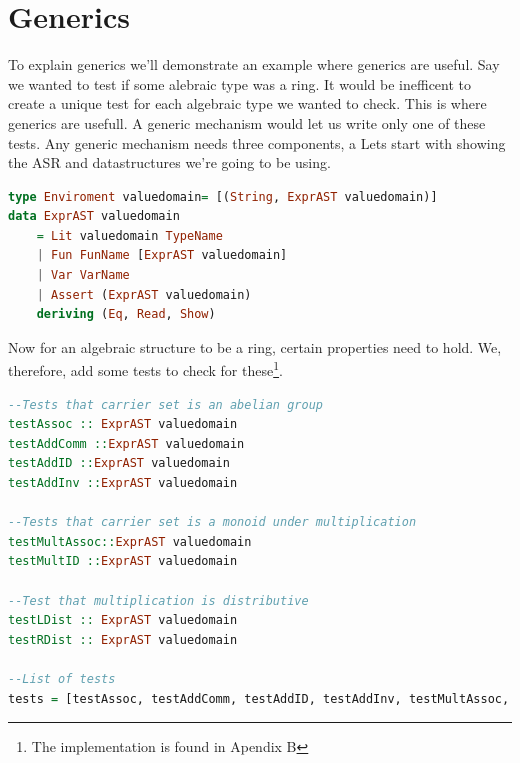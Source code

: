 \documentclass{article}
\begin{document}
    \section{Generics}
        To explain generics we'll demonstrate an example where generics are useful. Say we wanted to test if some alebraic type was a ring.
        It would be inefficent to create a unique test for each algebraic type we wanted to check. This is where generics are usefull.
        A generic mechanism would let us write only one of these tests. 
        Any generic mechanism needs three components, a
        Lets start with showing the ASR and datastructures we're going to be using.
        \begin{lstlisting}[language=Haskell]
type Enviroment valuedomain= [(String, ExprAST valuedomain)]
data ExprAST valuedomain
    = Lit valuedomain TypeName
    | Fun FunName [ExprAST valuedomain]
    | Var VarName
    | Assert (ExprAST valuedomain)
    deriving (Eq, Read, Show)
        \end{lstlisting}
        Now for an algebraic structure to be a ring, certain properties need to hold. We, therefore, add some tests to check for these\footnote{The implementation is found in Apendix B}.
        \begin{lstlisting}[language=Haskell]
--Tests that carrier set is an abelian group
testAssoc :: ExprAST valuedomain
testAddComm ::ExprAST valuedomain
testAddID ::ExprAST valuedomain
testAddInv ::ExprAST valuedomain

--Tests that carrier set is a monoid under multiplication
testMultAssoc::ExprAST valuedomain
testMultID ::ExprAST valuedomain

--Test that multiplication is distributive
testLDist :: ExprAST valuedomain
testRDist :: ExprAST valuedomain

--List of tests
tests = [testAssoc, testAddComm, testAddID, testAddInv, testMultAssoc, testMultID, testLDist, testRDist]

        \end{lstlisting}
\end{document}
